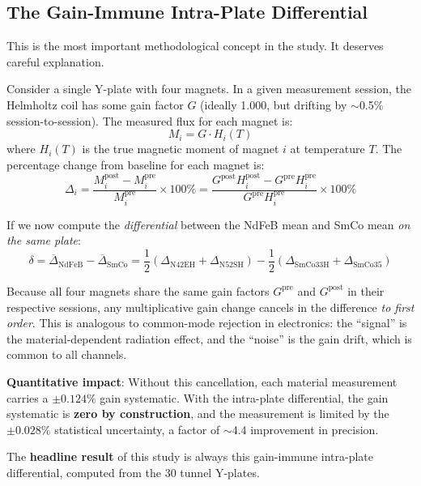 \documentclass[11pt,letterpaper]{article}
\begin{document}
\subsection{The Gain-Immune Intra-Plate Differential}
\label{sec:gain_immune}

This is the most important methodological concept in the study. It deserves
careful explanation.

Consider a single Y-plate with four magnets. In a given measurement session,
the Helmholtz coil has some gain factor $G$ (ideally 1.000, but drifting by
$\sim$0.5\% session-to-session). The measured flux for each magnet is:
\begin{equation}
    M_i = G \cdot H_i(T)
\end{equation}
where $H_i(T)$ is the true magnetic moment of magnet $i$ at temperature $T$.
The percentage change from baseline for each magnet is:
\begin{equation}
    \Delta_i = \frac{M_i^\mathrm{post} - M_i^\mathrm{pre}}{M_i^\mathrm{pre}} \times 100\%
    = \frac{G^\mathrm{post} H_i^\mathrm{post} - G^\mathrm{pre} H_i^\mathrm{pre}}{G^\mathrm{pre} H_i^\mathrm{pre}} \times 100\%
\end{equation}

If we now compute the \emph{differential} between the NdFeB mean and SmCo mean
\emph{on the same plate}:
\begin{equation}
    \delta = \overline{\Delta}_\mathrm{NdFeB} - \overline{\Delta}_\mathrm{SmCo}
    = \frac{1}{2}(\Delta_\mathrm{N42EH} + \Delta_\mathrm{N52SH})
    - \frac{1}{2}(\Delta_\mathrm{SmCo33H} + \Delta_\mathrm{SmCo35})
\end{equation}

Because all four magnets share the same gain factors $G^\mathrm{pre}$ and
$G^\mathrm{post}$ in their respective sessions, any multiplicative gain change
cancels in the difference \emph{to first order}. This is analogous to
common-mode rejection in electronics: the ``signal'' is the material-dependent
radiation effect, and the ``noise'' is the gain drift, which is common to all
channels.

\textbf{Quantitative impact}: Without this cancellation, each material
measurement carries a $\pm 0.124\%$ gain systematic. With the intra-plate
differential, the gain systematic is \textbf{zero by construction}, and the
measurement is limited by the $\pm 0.028\%$ statistical uncertainty, a factor
of $\sim$4.4 improvement in precision.

The \textbf{headline result} of this study is always this gain-immune
intra-plate differential, computed from the 30 tunnel Y-plates.
\end{document}
